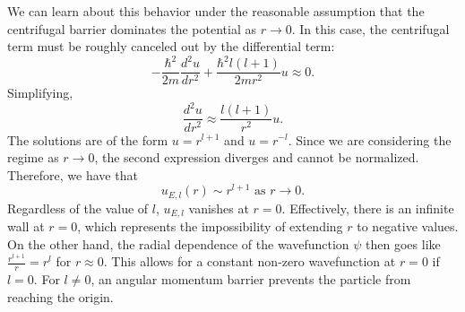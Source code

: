 We can learn about this behavior under the reasonable assumption that the centrifugal barrier dominates the potential as $r\to 0$. In this case, the centrifugal term must be roughly canceled out by the differential term: $$-\frac{\hbar^2}{2m}\frac{d^2u}{dr^2}+\frac{\hbar^2l(l+1)}{2mr^2}u\approx 0.$$Simplifying, $$\frac{d^2u}{dr^2}\approx\frac{l(l+1)}{r^2}u.$$The solutions are of the form $u=r^{l+1}$ and $u=r^{-l}$. Since we are considering the regime as $r\to0$, the second expression diverges and cannot be normalized. Therefore, we have that $$u_{E,l}(r)\sim r^{l+1} \text{ as }r\to0.$$Regardless of the value of $l$, $u_{E,l}$ vanishes at $r=0$. Effectively, there is an infinite wall at $r=0$, which represents the impossibility of extending $r$ to negative values. On the other hand, the radial dependence of the wavefunction $\psi$ then goes like $\frac{r^{l+1}}{r}=r^l$ for $r\approx 0$. This allows for a constant non-zero wavefunction at $r=0$ if $l=0$. For $l\neq 0$, an angular momentum barrier prevents the particle from reaching the origin.